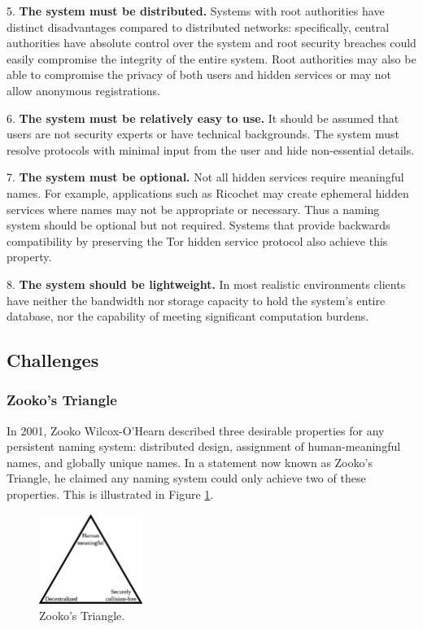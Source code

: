 \documentclass[conference]{IEEEtran}
\begin{document}
5. \textbf{The system must be distributed.} Systems with root authorities have distinct disadvantages compared to distributed networks: specifically, central authorities have absolute control over the system and root security breaches could easily compromise the integrity of the entire system. Root authorities may also be able to compromise the privacy of both users and hidden services or may not allow anonymous registrations.

6. \textbf{The system must be relatively easy to use.} It should be assumed that users are not security experts or have technical backgrounds. The system must resolve protocols with minimal input from the user and hide non-essential details.

7. \textbf{The system must be optional.} Not all hidden services require meaningful names. For example, applications such as Ricochet\cite{RicochetGithub} may create ephemeral hidden services where names may not be appropriate or necessary. Thus a naming system should be optional but not required. Systems that provide backwards compatibility by preserving the Tor hidden service protocol also achieve this property.

8. \textbf{The system should be lightweight.} In most realistic environments clients have neither the bandwidth nor storage capacity to hold the system's entire database, nor the capability of meeting significant computation burdens.

\subsection{Challenges}

\subsubsection{Zooko's Triangle}
\label{sec:ZookosTriangle}

In 2001, Zooko Wilcox-O'Hearn described three desirable properties for any persistent naming system: distributed design, assignment of human-meaningful names, and globally unique names. In a statement now known as Zooko's Triangle,\cite{ferdous2009security}\cite{stiegler2005petname} he claimed any naming system could only achieve two of these properties. This is illustrated in Figure \ref{fig:ZookosTriangle}.

\begin{figure}[htbp]
	\centering
	\includegraphics[width=0.3\textwidth]{../assets/images/Zooko.eps}
	\caption{Zooko's Triangle.}
	\label{fig:ZookosTriangle}
\end{figure}
\end{document}
